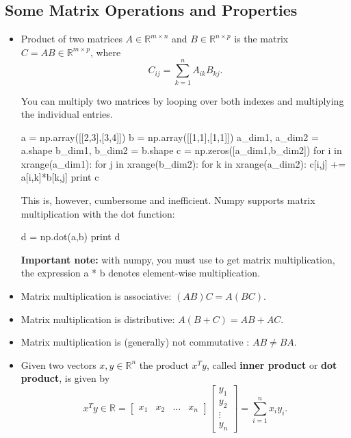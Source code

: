 \subsection{Some Matrix Operations and Properties}
\begin{itemize}
\item Product of two matrices $A \in \mathbb{R}^{m\times n}$ and $B \in \mathbb{R}^{n\times p}$
is the matrix $C=AB \in \mathbb{R}^{m\times p}$, where 
\begin{equation*}
C_{ij}=\sum\limits_{k=1}^{n}A_{ik}B_{kj}.
\end{equation*}

\begin{exercise}
You can multiply two matrices by looping over both indexes and multiplying the individual entries.
\begin{python}
a = np.array([[2,3],[3,4]])
b = np.array([[1,1],[1,1]])
a_dim1, a_dim2 = a.shape
b_dim1, b_dim2 = b.shape
c = np.zeros([a_dim1,b_dim2])
for i in xrange(a_dim1):
   for j in xrange(b_dim2):
       for k in xrange(a_dim2):
          c[i,j] += a[i,k]*b[k,j]
print c
\end{python}

This is, however, cumbersome and inefficient. Numpy supports matrix
multiplication with the dot function:

\begin{python}
d = np.dot(a,b)
print d
\end{python}

\textbf{Important note:} with numpy, you must use  to get matrix
multiplication, the expression {a * b} denotes element-wise multiplication.
\end{exercise}

\item Matrix multiplication is associative: $(AB)C= A(BC)$.
\item Matrix multiplication is distributive: $A(B+C)= AB + AC$.
\item Matrix multiplication is (generally) not commutative : $AB \neq BA$.
\item Given two vectors $x,y \in \mathbb{R}^{n}$ the product $x^{T}y$, called {\bf inner product}
or {\bf dot product}, is given by
\begin{equation*}
x^{T}y \in \mathbb{R} = \left[\begin{array}{cccc}
x_{1}&x_{2}&\ldots&x_{n}\end{array}\right] \left[\begin{array}{c}
y_{1} \\
y_{2} \\
\vdots \\
y_{n}
\end{array}\right] = \sum\limits_{i=1}^{n}x_{i}y_{i}.
\end{equation*}


\end{itemize}
